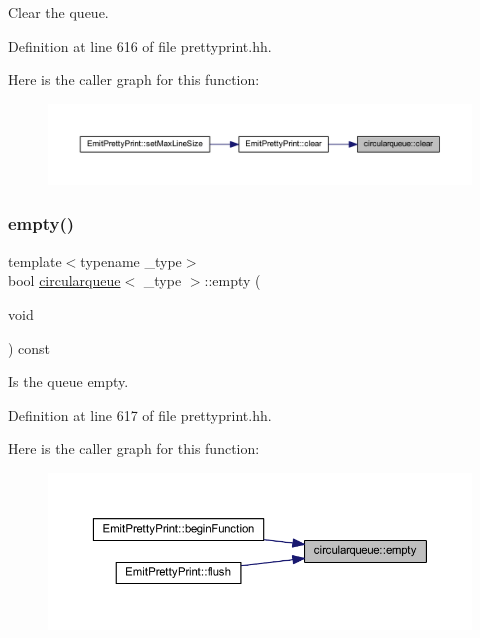 Clear the queue. 



Definition at line 616 of file prettyprint.\+hh.

Here is the caller graph for this function\+:
\nopagebreak
\begin{figure}[H]
\begin{center}
\leavevmode
\includegraphics[width=350pt]{classcircularqueue_ac205d631400bc42fb797614c89e41c88_icgraph}
\end{center}
\end{figure}
\mbox{\label{classcircularqueue_ac4c5196899d81b6ff072e06a4e0e7893}} 
\subsubsection{\texorpdfstring{empty()}{empty()}}
{\footnotesize\ttfamily template$<$typename \+\_\+type$>$ \\
bool \mbox{\hyperlink{classcircularqueue}{circularqueue}}$<$ \+\_\+type $>$\+::empty (\begin{DoxyParamCaption}\item[{void}]{ }\end{DoxyParamCaption}) const\hspace{0.3cm}{\ttfamily [inline]}}



Is the queue empty. 



Definition at line 617 of file prettyprint.\+hh.

Here is the caller graph for this function\+:
\nopagebreak
\begin{figure}[H]
\begin{center}
\leavevmode
\includegraphics[width=350pt]{classcircularqueue_ac4c5196899d81b6ff072e06a4e0e7893_icgraph}
\end{center}
\end{figure}
\mbox{\label{classcircularqueue_aef399e8b70e1ba008d6f515d9f45b59f}} 
